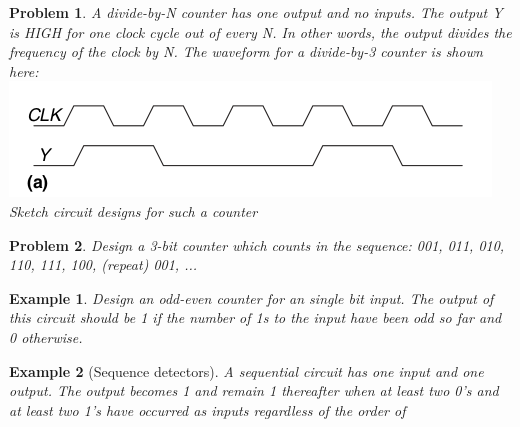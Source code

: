 \documentclass{article}
\newtheorem{example}{Example}
\newtheorem{prob}{Problem}
\begin{document}
\begin{prob}
  A divide-by-N counter has one output and no inputs. The output Y is HIGH for
  one clock cycle out of every N. In other words, the output divides the frequency
  of the clock by N. The waveform for a divide-by-3 counter is shown here:\\
  \includegraphics[width=0.8\linewidth]{./fig/fig.38a-divide-by-3-counter.png}\\
  Sketch circuit designs for such a counter
\end{prob}

\begin{prob}
  Design a 3-bit counter which counts in the sequence:
  001, 011, 010, 110, 111, 100, (repeat) 001, ...
\end{prob}

\begin{example}
  Design an odd-even counter for an single bit input. The output of this circuit
  should be 1 if the number of 1s to the input have been odd so far and 0
  otherwise.
\end{example}

\begin{example}[Sequence detectors]
  A sequential circuit has one input and one output. The output becomes 1 and
  remain 1 thereafter when at least two 0's and at least two 1's have occurred
  as inputs regardless of the order of 
\end{example}
\end{document}
